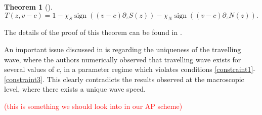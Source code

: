 \documentclass[11pt,twoside]{article}
\DeclareMathOperator{\sign}{sign}
\theoremstyle{plain}
\newtheorem{theorem}{Theorem}[section]
\theoremstyle{nonumberplain}
\begin{document}
\begin{theorem}[\cite{calvez2016chemotactic}]
\[
    T(z, v-c) = 1 - \chi_S \sign((v-c)\partial_zS(z)) - \chi_N \sign((v-c)\partial_zN(z)) .
\]

\end{theorem}
The details of the proof of this theorem can be found in \cite{calvez2016chemotactic}.

\noindent An important issue discussed in \cite{calvez2018well} is regarding the uniqueness of the travelling wave, where the authors numerically observed that travelling wave exists for several values of $c$, in a parameter regime which violates conditions \eqref{constraint1}-\eqref{constraint3}. This clearly contradicts the results observed at the macroscopic level, where there exists a unique wave speed.  

\textcolor{red}{(this is something we should look into in our AP scheme)}
\end{document}
